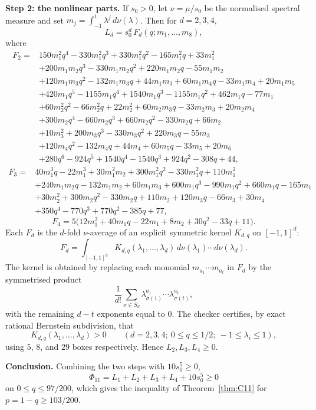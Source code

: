 \documentclass[11pt]{article}
\begin{document}
\medskip\noindent\textbf{Step 2: the nonlinear parts.}
If $s_0>0$, let $\nu=\mu/s_0$ be the normalised spectral measure and set $m_j=\int_{-1}^1\lambda^j\,d\nu(\lambda)$.  Then for $d=2,3,4$,
\[
        L_d=s_0^d\,F_d(q;m_1,\ldots,m_8),
\]
where
\begin{align*}
F_2={}&150m_1^2q^4-330m_1^2q^3+330m_1^2q^2-165m_1^2q+33m_1^2 \\
&+200m_1m_2q^3-330m_1m_2q^2+220m_1m_2q-55m_1m_2 \\
&+120m_1m_3q^2-132m_1m_3q+44m_1m_3+60m_1m_4q-33m_1m_4+20m_1m_5 \\
&+420m_1q^5-1155m_1q^4+1540m_1q^3-1155m_1q^2+462m_1q-77m_1 \\
&+60m_2^2q^2-66m_2^2q+22m_2^2+60m_2m_3q-33m_2m_3+20m_2m_4 \\
&+300m_2q^4-660m_2q^3+660m_2q^2-330m_2q+66m_2 \\
&+10m_3^2+200m_3q^3-330m_3q^2+220m_3q-55m_3 \\
&+120m_4q^2-132m_4q+44m_4+60m_5q-33m_5+20m_6 \\
&+280q^6-924q^5+1540q^4-1540q^3+924q^2-308q+44,
\end{align*}
\begin{align*}
F_3={}&40m_1^3q-22m_1^3+30m_1^2m_2+300m_1^2q^2-330m_1^2q+110m_1^2 \\
&+240m_1m_2q-132m_1m_2+60m_1m_3+600m_1q^3-990m_1q^2+660m_1q-165m_1 \\
&+30m_2^2+300m_2q^2-330m_2q+110m_2+120m_3q-66m_3+30m_4 \\
&+350q^4-770q^3+770q^2-385q+77,
\end{align*}
\[
        F_4=5\bigl(12m_1^2+40m_1q-22m_1+8m_2+30q^2-33q+11\bigr).
\]
Each $F_d$ is the $d$-fold $\nu$-average of an explicit symmetric kernel $K_{d,q}$ on $[-1,1]^d$:
\[
        F_d=\int_{[-1,1]^d}K_{d,q}(\lambda_1,\ldots,\lambda_d)\,d\nu(\lambda_1)\cdots d\nu(\lambda_d).
\]
The kernel is obtained by replacing each monomial $m_{a_1}\cdots m_{a_t}$ in $F_d$ by the symmetrised product
\[
        \frac1{d!}\sum_{\sigma\in S_d}\lambda_{\sigma(1)}^{a_1}\cdots\lambda_{\sigma(t)}^{a_t},
\]
with the remaining $d-t$ exponents equal to $0$.  The checker certifies, by exact rational Bernstein subdivision, that
\begin{equation}\label{eq:Kd-positive}
        K_{d,q}(\lambda_1,\ldots,\lambda_d)>0
        \qquad
        (d=2,3,4;\ 0\le q\le1/2;\ -1\le\lambda_i\le1),
\end{equation}
using $5$, $8$, and $29$ boxes respectively.  Hence $L_2,L_3,L_4\ge0$.

\medskip\noindent\textbf{Conclusion.}
Combining the two steps with $10s_0^5\ge0$,
\[
        \Phi_{11}=L_1+L_2+L_3+L_4+10s_0^5\ge0
\]
on $0\le q\le 97/200$, which gives the inequality of Theorem~\ref{thm:C11} for $p=1-q\ge103/200$.
\end{document}
